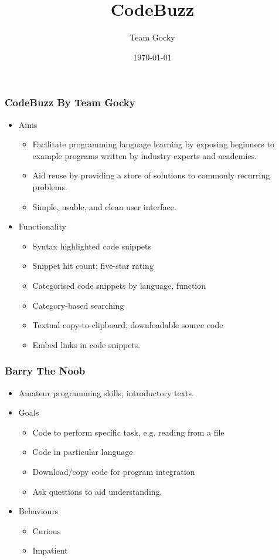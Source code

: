 \documentclass[handout, t]{beamer}
\title[DIM3 Project Presentation]{CodeBuzz}
\author{Team Gocky}
\institute{University Of Glasgow}
\date{\today}
\begin{document}
\begin{frame}
\frametitle{CodeBuzz By Team Gocky}
\begin{itemize}
\item Aims
    \begin{itemize}
    \item Facilitate programming language learning by exposing beginners to
    example programs written by industry experts and academics.
    \item Aid reuse by providing a store of solutions to commonly recurring
    problems.
    \item Simple, usable, and clean user interface.
    \end{itemize}
\item Functionality
    \begin{itemize}
    \item Syntax highlighted code snippets
    \item Snippet hit count; five-star rating
    \item Categorised code snippets by language, function
    \item Category-based searching
    \item Textual copy-to-clipboard; downloadable source code
    \item Embed links in code snippets.
    \end{itemize}
\end{itemize}
\end{frame}

\begin{frame}
\frametitle{Barry The Noob}
\begin{itemize}
\item Amateur programming skills; introductory texts.
\item Goals
    \begin{itemize}
    \item Code to perform specific task, e.g. reading from a file
    \item Code in particular language
    \item Download/copy code for program integration
    \item Ask questions to aid understanding.
    \end{itemize}
\item Behaviours
    \begin{itemize}
    \item Curious
    \item Impatient
    \end{itemize}
\end{itemize}
\end{frame}
\end{document}
